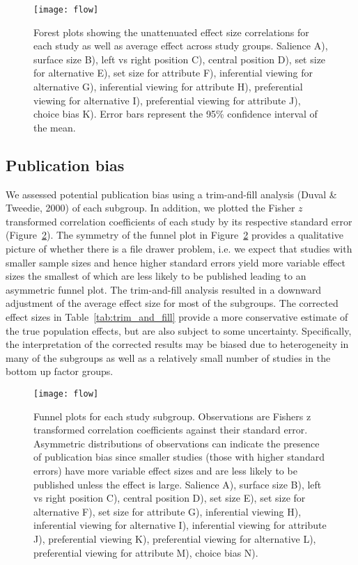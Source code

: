 \documentclass{article}
\begin{document}
\begin{figure}[H]
\texttt{[image: flow]}
\centering
\caption{Forest plots showing the unattenuated effect size correlations for each study as well as average effect across study groups. Salience A), surface size B), left vs right position C), central position D), set size for alternative E), set size for attribute F), inferential viewing for alternative G), inferential viewing for attribute H), preferential viewing for alternative I), preferential viewing for attribute J), choice bias K). Error bars represent the 95\% confidence interval of the mean.}
\label{fig:forest_plots}
\end{figure}


\subsection{Publication bias}

We assessed potential publication bias using a trim-and-fill analysis (Duval \& Tweedie, 2000) of each subgroup. In addition, we plotted the Fisher $z$ transformed correlation coefficients of each study by its respective standard error (Figure~\ref{fig:funnel_plots}). The symmetry of the funnel plot in Figure~\ref{fig:funnel_plots} provides a qualitative picture of whether there is a file drawer problem, i.e. we expect that studies with smaller sample sizes and hence higher standard errors yield more variable effect sizes the smallest of which are less likely to be published leading to an asymmetric funnel plot. The trim-and-fill analysis resulted in a downward adjustment of the average effect size for most of the subgroups. The corrected effect sizes in Table~\ref{tab:trim_and_fill} provide a more conservative estimate of the true population effects, but are also subject to some uncertainty. Specifically, the interpretation of the corrected results may be biased due to heterogeneity in many of the subgroups as well as a relatively small number of studies in the bottom up factor groups.


\begin{figure}[H]
\texttt{[image: flow]}
\centering
\caption{Funnel plots for each study subgroup. Observations are Fishers z transformed correlation coefficients against their standard error. Asymmetric distributions of observations can indicate the presence of publication bias since smaller studies (those with higher standard errors) have more variable effect sizes and are less likely to be published unless the effect is large. Salience A), surface size B), left vs right position C), central position D), set size E), set size for alternative F), set size for attribute G), inferential viewing H), inferential viewing for alternative I), inferential viewing for attribute J), preferential viewing K), preferential viewing for alternative L), preferential viewing for attribute M), choice bias N).}
\label{fig:funnel_plots}
\end{figure}
\end{document}

